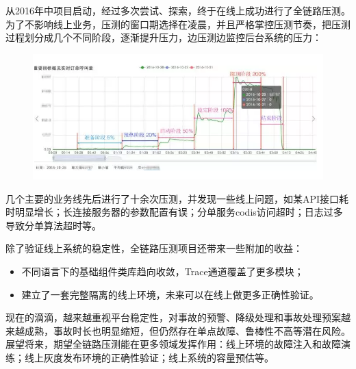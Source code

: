 \documentclass[12pt]{article}
\begin{document}
从2016年中项目启动，经过多次尝试、探索，终于在线上成功进行了全链路压测。为了不影响线上业务，压测的窗口期选择在凌晨，并且严格掌控压测节奏，把压测过程划分成几个不同阶段，逐渐提升压力，边压测边监控后台系统的压力：
\begin{figure}[H]
    \centering
    \includegraphics[width=1\textwidth]{fig/DIDI_Pressure_11.png}
\end{figure}

几个主要的业务线先后进行了十余次压测，并发现一些线上问题，如某API接口耗时明显增长；长连接服务器的参数配置有误；分单服务codis访问超时；日志过多导致分单算法超时等。

除了验证线上系统的稳定性，全链路压测项目还带来一些附加的收益：
\begin{itemize}
\setlength{\itemsep}{0pt}
\setlength{\parsep}{0pt}
\setlength{\parskip}{0pt}
    \item 不同语言下的基础组件类库趋向收敛，Trace通道覆盖了更多模块；
    \item 建立了一套完整隔离的线上环境，未来可以在线上做更多正确性验证。
\end{itemize}

现在的滴滴，越来越重视平台稳定性，对事故的预警、降级处理和事故处理预案越来越成熟，事故时长也明显缩短，但仍然存在单点故障、鲁棒性不高等潜在风险。展望将来，期望全链路压测能在更多领域发挥作用：线上环境的故障注入和故障演练；线上灰度发布环境的正确性验证；线上系统的容量预估等。



\end{document}

